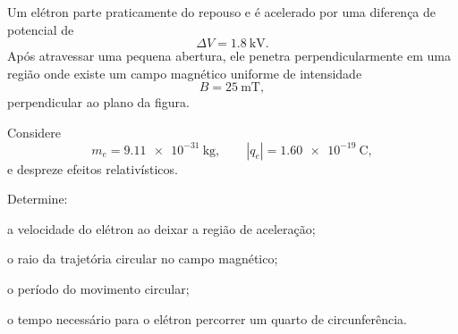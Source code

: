 \begin{questao}[4]{}

Um elétron parte praticamente do repouso e é acelerado por uma diferença de
potencial de
\[
\Delta V=\SI{1.8}{\kilo\volt}.
\]
Após atravessar uma pequena abertura, ele penetra perpendicularmente em uma
região onde existe um campo magnético uniforme de intensidade
\[
B=\SI{25}{\milli\tesla},
\]
perpendicular ao plano da figura.

Considere
\[
m_e=\SI{9.11e-31}{\kilogram},
\qquad
|q_e|=\SI{1.60e-19}{\coulomb},
\]
e despreze efeitos relativísticos.

Determine:

\begin{itensq}
    \item a velocidade do elétron ao deixar a região de aceleração;
    \item o raio da trajetória circular no campo magnético;
    \item o período do movimento circular;
    \item o tempo necessário para o elétron percorrer um quarto de circunferência.
\end{itensq}

\begin{center}
\end{center}
\end{questao}
